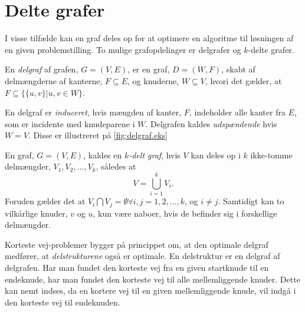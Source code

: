 \section{Delte grafer}
I visse tilfælde kan en graf deles op for at optimere en algoritme til løsningen af en given problemstilling.
To mulige grafopdelinger er delgrafer og $k$-delte grafer.

\begin{defn}[Delgraf] \label{defn:delgraf} %
En \emph{delgraf} af grafen, $G= (V,E)$, er en graf, $D = (W,F)$, skabt af delmængderne af kanterne, $F \subseteq E$, og knuderne, $W \subseteq V$, hvori det gælder, at $F \subseteq \{ \{u,v\} | u,v \in W \}$.
\end{defn}

En delgraf er \emph{induceret}, hvis mængden af kanter, $F$, indeholder alle kanter fra $E$, som er incidente med knudeparene i $W$.
Delgrafen kaldes \emph{udspændende} hvis $W=V$. Disse er illustreret på \autoref{fig:delgraf.eks}



\begin{defn} \label{defn:k-delt} %
En graf, $G = (V, E)$, kaldes en \emph{$k$-delt graf}, hvis $V$ kan deles op i $k$ ikke-tomme delmængder, $V_1, V_2,\dotsc, V_k$, således at 
\begin{equation}
V = \bigcup_{i=1}^{k} V_i. 
\end{equation}
Foruden gælder det at $V_i \bigcap V_j  = \emptyset \forall i,j=1, 2, \dotsc, k$, og $i\neq j$. Samtidigt kan to vilkårlige knuder, $v$ og $u$, kun være naboer, hvis de befinder sig i forskellige delmængder. 
\end{defn}


Korteste vej-problemer bygger på princippet om, at den optimale delgraf medfører, at \emph{delstrukturene} også er optimale. En delstruktur er en delgraf af delgrafen. Har man fundet den korteste vej fra en given startknude til en endeknude, har man fundet den korteste vej til alle mellemliggende knuder. Dette kan nemt indses, da en kortere vej til en given mellemliggende knude, vil indgå i den korteste vej til endeknuden.











